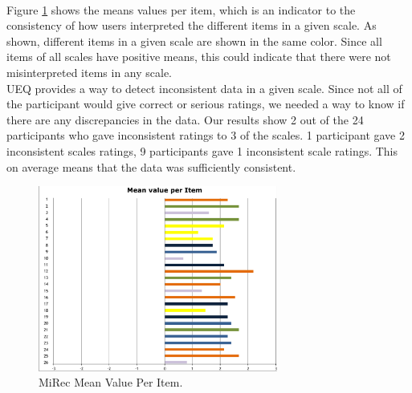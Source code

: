 \\
Figure \ref{fig:figure56} shows the means values per item, which is an indicator
to the consistency of how users interpreted the different items in a given
scale. As shown, different items in a given scale are shown in the same color.
Since all items of all scales have positive means, this could indicate that
there were not misinterpreted items in any scale.\\

UEQ provides a way to detect inconsistent data in a given scale. Since not all
of the participant would give correct or serious ratings, we needed a way to
know if there are any discrepancies in the data. Our results show 2 out of
the 24 participants who gave inconsistent ratings to 3 of the scales. 1
participant gave 2 inconsistent scales ratings, 9 participants gave 1
inconsistent scale ratings. This on average means that the data was sufficiently
consistent.
\begin{figure}[!htbp]
\centering
\includegraphics[width=0.7\textwidth]{figures/mirec-results3}
\caption{MiRec Mean Value Per Item.}
\label{fig:figure56}
\end{figure}
